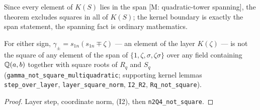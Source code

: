 Since every element of $K(S)$ lies in the span [M: quadratic-tower spanning],
the theorem excludes squares in all of $K(S)$; the kernel boundary is exactly the
span statement, the spanning fact is ordinary mathematics.

\begin{theorem}\label{gamma_verdicts}\leanok
{}
For either sign, $\gamma_{\pm}=s_{1n}(s_{1n}\mp\zeta)$ --- an element of the
layer $K(\zeta)$ --- is not the square of any element of the span of
$\{1,\zeta,\sigma,\zeta\sigma\}$ over any field containing $\mathbb{Q}(a,b)$ together
with square roots of $R_{q}$ and $S_{q}$
(\texttt{gamma\_not\_square\_multiquadratic};
supporting kernel lemmas \texttt{step\_over\_layer}, \texttt{layer\_square\_norm},
\texttt{I2\_R2}, \texttt{Rq\_not\_square}).
\end{theorem}
\begin{proof}\leanok
Layer step, coordinate norm, (I2), then \texttt{n2Q4\_not\_square}.
\end{proof}

